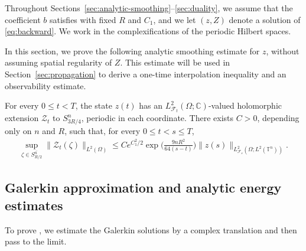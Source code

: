 \documentclass[print,wide]{draft}
\begin{document}
Throughout Sections~\ref{sec:analytic-smoothing}--\ref{sec:duality}, we assume that the coefficient \(b\) satisfies  with fixed \(R\) and \(C_1\), and we let \((z,Z)\) denote a solution of \eqref{eq:backward}. We work in the complexifications of the periodic Hilbert spaces.

In this section, we prove the following analytic smoothing estimate for \(z\), without assuming spatial regularity of \(Z\). This estimate will be used in Section~\ref{sec:propagation} to derive a one-time interpolation inequality and an observability estimate.

\begin{theorem}
\label{thm:analytic-smoothing}
For every $0\leq t<T$, the state $z(t)$ has an
$L^2_{\mathcal{F}_t}(\Omega;\mathbb{C})$-valued holomorphic extension
$\mathscr Z_t$ to $S_{3R/4}^n$, periodic in each coordinate.
There exists $C>0$, depending only on $n$ and $R$, such that, for every
$0\leq t<s\leq T$,
\begin{align}\label{eq:fixed-strip-smoothing}
\sup_{\zeta\in\overline{S_{R/2}^n}}
\lVert \mathscr Z_t(\zeta)\rVert_{L^2(\Omega)}
\leq C e^{C_1^2/2}
\exp\biggl(\frac{9nR^2}{64(s-t)}\biggr)
\lVert z(s)\rVert_{L^2_{\mathcal{F}_s}(\Omega;L^2(\mathbb{T}^n))}.
\end{align}
\end{theorem}

\subsection{Galerkin approximation and analytic energy estimates}

To prove , we estimate the Galerkin solutions
by a complex translation and then pass to the limit.
\end{document}
